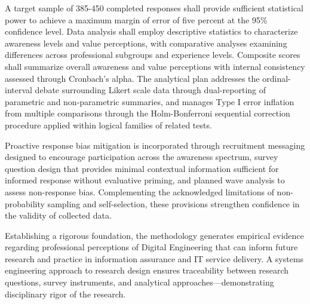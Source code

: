 A target sample of 385-450 completed responses shall provide sufficient statistical power to achieve a maximum margin of error of five percent at the 95\% confidence level. Data analysis shall employ descriptive statistics to characterize awareness levels and value perceptions, with comparative analyses examining differences across professional subgroups and experience levels. Composite scores shall summarize overall awareness and value perceptions with internal consistency assessed through Cronbach's alpha. The analytical plan addresses the ordinal-interval debate surrounding Likert scale data through dual-reporting of parametric and non-parametric summaries, and manages Type I error inflation from multiple comparisons through the Holm-Bonferroni sequential correction procedure applied within logical families of related tests.

Proactive response bias mitigation is incorporated through recruitment messaging designed to encourage participation across the awareness spectrum, survey question design that provides minimal contextual information sufficient for informed response without evaluative priming, and planned wave analysis to assess non-response bias. Complementing the acknowledged limitations of non-probability sampling and self-selection, these provisions strengthen confidence in the validity of collected data.

Establishing a rigorous foundation, the methodology generates empirical evidence regarding professional perceptions of Digital Engineering that can inform future research and practice in information assurance and IT service delivery. A systems engineering approach to research design ensures traceability between research questions, survey instruments, and analytical approaches---demonstrating disciplinary rigor of the research.

